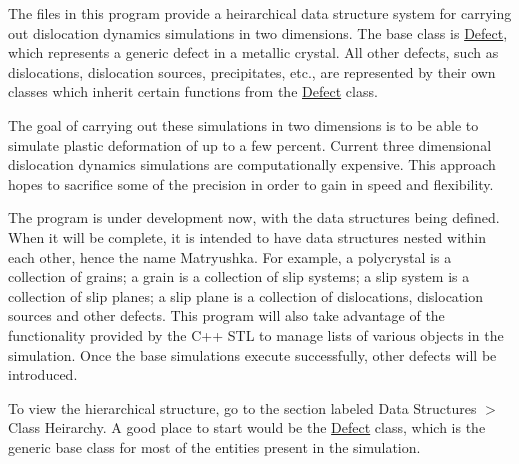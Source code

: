 The files in this program provide a heirarchical data structure system for carrying out dislocation dynamics simulations in two dimensions. The base class is \hyperlink{classDefect}{Defect}, which represents a generic defect in a metallic crystal. All other defects, such as dislocations, dislocation sources, precipitates, etc., are represented by their own classes which inherit certain functions from the \hyperlink{classDefect}{Defect} class.

The goal of carrying out these simulations in two dimensions is to be able to simulate plastic deformation of up to a few percent. Current three dimensional dislocation dynamics simulations are computationally expensive. This approach hopes to sacrifice some of the precision in order to gain in speed and flexibility.

The program is under development now, with the data structures being defined. When it will be complete, it is intended to have data structures nested within each other, hence the name Matryushka. For example, a polycrystal is a collection of grains; a grain is a collection of slip systems; a slip system is a collection of slip planes; a slip plane is a collection of dislocations, dislocation sources and other defects. This program will also take advantage of the functionality provided by the C++ S\-T\-L to manage lists of various objects in the simulation. Once the base simulations execute successfully, other defects will be introduced.

To view the hierarchical structure, go to the section labeled Data Structures $>$ Class Heirarchy. A good place to start would be the \hyperlink{classDefect}{Defect} class, which is the generic base class for most of the entities present in the simulation. 